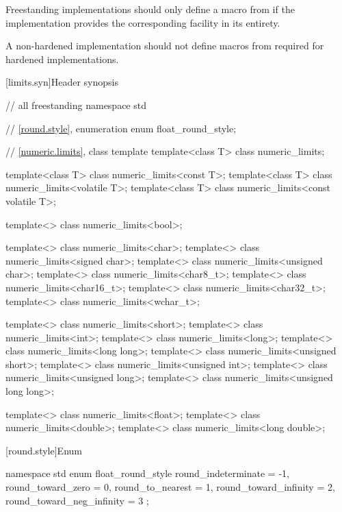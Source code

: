 \pnum
\recommended
Freestanding implementations should only define a macro from 
if the implementation provides the corresponding facility in its entirety.

\pnum
\recommended
A non-hardened implementation should not define macros from 
required for hardened implementations.

[limits.syn]{Header  synopsis}

%
%
%
%

\begin{codeblock}
// all freestanding
namespace std {
  // \ref{round.style}, enumeration 
  enum float_round_style;

  // \ref{numeric.limits}, class template 
  template<class T> class numeric_limits;

  template<class T> class numeric_limits<const T>;
  template<class T> class numeric_limits<volatile T>;
  template<class T> class numeric_limits<const volatile T>;

  template<> class numeric_limits<bool>;

  template<> class numeric_limits<char>;
  template<> class numeric_limits<signed char>;
  template<> class numeric_limits<unsigned char>;
  template<> class numeric_limits<char8_t>;
  template<> class numeric_limits<char16_t>;
  template<> class numeric_limits<char32_t>;
  template<> class numeric_limits<wchar_t>;

  template<> class numeric_limits<short>;
  template<> class numeric_limits<int>;
  template<> class numeric_limits<long>;
  template<> class numeric_limits<long long>;
  template<> class numeric_limits<unsigned short>;
  template<> class numeric_limits<unsigned int>;
  template<> class numeric_limits<unsigned long>;
  template<> class numeric_limits<unsigned long long>;

  template<> class numeric_limits<float>;
  template<> class numeric_limits<double>;
  template<> class numeric_limits<long double>;
}
\end{codeblock}

[round.style]{Enum }

%
\begin{codeblock}
namespace std {
  enum float_round_style {
    round_indeterminate       = -1,
    round_toward_zero         =  0,
    round_to_nearest          =  1,
    round_toward_infinity     =  2,
    round_toward_neg_infinity =  3
  };
}
\end{codeblock}

